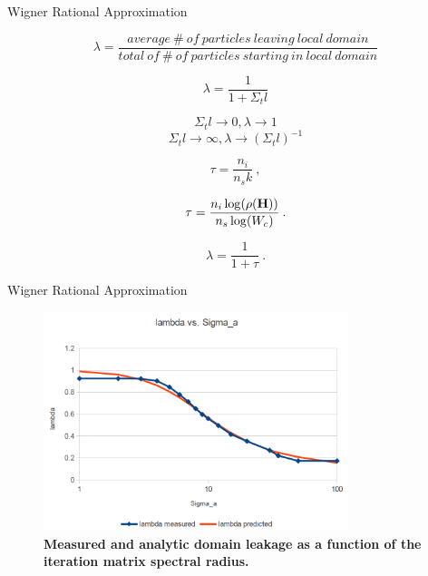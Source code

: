 \documentclass{beamer}
\begin{document}
\begin{frame}{Wigner Rational Approximation}

  \begin{equation}
    \lambda = \frac{average\ \#\ of\ particles\ leaving\ local\ domain}
            {total\ of\ \#\ of\ particles\ starting\ in\ local\ domain}
            \label{eq:leakage_fraction}
  \end{equation}

  \begin{equation}
    \lambda = \frac{1}{1+\Sigma_t l}
    \label{eq:leakage_fraction}
  \end{equation}

  \[
  \Sigma_t l \rightarrow 0,\lambda \rightarrow 1
  \]
  \[
  \Sigma_t l \rightarrow \infty, \lambda \rightarrow (\Sigma_t l)^{-1}
  \]

\begin{equation}
  \tau = \frac{n_i}{n_s k}\:,
  \label{eq:matrix_optical_thickness}
\end{equation}

\begin{equation}
  \tau = \frac{n_i \log(\rho(\mathbf{H}))}{n_s \log(W_c)}\:.
  \label{eq:matrix_optical_thickness_2}
\end{equation}

\begin{equation}
  \lambda = \frac{1}{1+\tau}\:.
  \label{eq:analytic_domain_leakage}
\end{equation}

\end{frame}

\begin{frame}{Wigner Rational Approximation}

  \begin{figure}[t!]
    \begin{center}
      \includegraphics[width=3.5in,clip]{measured_leakage.png}
    \end{center}
    \caption{\textbf{Measured and analytic domain leakage as a function
        of the iteration matrix spectral radius.}}
    \label{fig:measured_leakage}
  \end{figure}

\end{frame}
\end{document}
